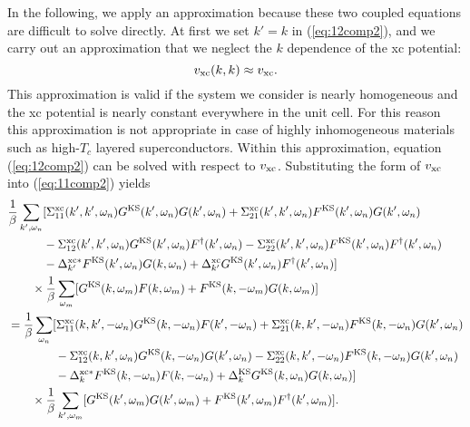 %
In the following, we apply an approximation because these two coupled equations are difficult 
to solve directly. At first we set $k' = k$ in (\ref{eq:12comp2}), and we carry out an 
approximation that we neglect the $k$ dependence of the xc potential:
%
\begin{equation}
	v_{\rm xc}(k,k) \approx v_{\rm xc}.
	\label{eq:vxcapprox}
\end{equation}
%
This approximation is valid if the system we consider is nearly homogeneous and the xc potential is
nearly constant everywhere in the unit cell. For this reason this approximation is not appropriate
in case of highly inhomogeneous materials such as high-$T_c$ layered superconductors.
Within this approximation, equation (\ref{eq:12comp2}) can be solved with respect to $v_{\rm xc}$.
Substituting the form of $v_{\rm xc}$ into (\ref{eq:11comp2}) yields
%
\begin{equation}
\begin{split}
	& \frac{1}{\beta} \sum_{k',\omega_n} [\Sigma^{\rm xc}_{11}(k',k',\omega_n)
	  G^{\rm KS}(k',\omega_n)G(k',\omega_n) + \Sigma^{\rm xc}_{21}(k',k',\omega_n)
	  F^{\rm KS}(k',\omega_n)G(k',\omega_n) \\
  	&\quad \quad \quad - \Sigma^{\rm xc}_{12}(k',k',\omega_n)G^{\rm KS}(k',\omega_n)F^{\dag}(k',\omega_n)
	- \Sigma^{\rm xc}_{22}(k',k',\omega_n)F^{\rm KS}(k',\omega_n)F^{\dag}(k',\omega_n) \\
	&\quad \quad \quad -\Delta^{\rm xc \ast}_{k'}F^{\rm KS}(k',\omega_n)G(k,\omega_n) + 
	\Delta^{\rm xc}_{k'}G^{\rm KS}(k',\omega_n)F^{\dag}(k',\omega_n)] \\
	&\quad \quad \times \frac{1}{\beta}\sum_{\omega_m} [G^{\rm KS}(k,\omega_m)F(k,\omega_m) + 
	F^{\rm KS}(k,-\omega_m)G(k,\omega_m)] \\
	& = 
	 \frac{1}{\beta} \sum_{\omega_n} [\Sigma^{\rm xc}_{11}(k,k',-\omega_n)
	  G^{\rm KS}(k,-\omega_n)F(k',-\omega_n) + \Sigma^{\rm xc}_{21}(k,k',-\omega_n)
	  F^{\rm KS}(k,-\omega_n)G(k',\omega_n) \\
  	&\quad \quad \quad \quad- \Sigma^{\rm xc}_{12}(k,k',\omega_n)G^{\rm KS}(k,-\omega_n)G(k',\omega_n)
	- \Sigma^{\rm xc}_{22}(k,k',-\omega_n)F^{\rm KS}(k,-\omega_n)G(k',\omega_n) \\
	&\quad \quad \quad \quad-\Delta^{\rm xc \ast}_{k}F^{\rm KS}(k,-\omega_n)F(k,-\omega_n)
	+ \Delta^{\rm KS}_{k}G^{\rm KS}(k,\omega_n)G(k,\omega_n) ] \\
	& \quad \quad \times 
	\frac{1}{\beta} \sum_{k',\omega_m}[ G^{\rm KS}(k',\omega_m)G(k',\omega_m) + 
	F^{\rm KS}(k', \omega_m)F^{\dag}(k',\omega_m)].
	\label{eq:vxcvanish}
\end{split}
\end{equation}
